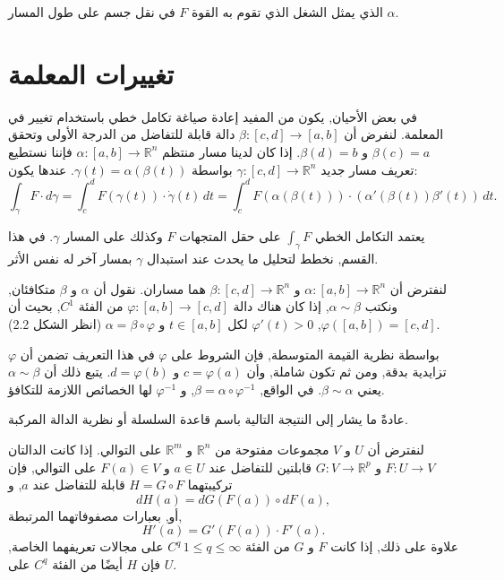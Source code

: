 الذي يمثل الشغل الذي تقوم به القوة \(F\) في نقل جسم على طول المسار \(\alpha\).


\section{ تغييرات المعلمة}

في بعض الأحيان, يكون من المفيد إعادة صياغة تكامل خطي باستخدام تغيير في المعلمة. لنفرض أن \(\beta : [c, d] \to [a, b]\) دالة قابلة للتفاضل من الدرجة الأولى وتحقق \(\beta(c) = a\) و \(\beta(d) = b\). إذا كان لدينا مسار منتظم \(\alpha : [a, b] \to \mathbb{R}^n\) فإننا نستطيع تعريف مسار جديد \(\gamma : [c, d] \to \mathbb{R}^n\) بواسطة \(\gamma(t) = \alpha(\beta(t))\). عندها يكون:
\[ \int_\gamma F \cdot d\gamma = \int_c^d F(\gamma(t)) \cdot \dot{\gamma}(t) \, dt = \int_c^d F(\alpha(\beta(t))) \cdot (\alpha'(\beta(t)) \beta'(t)) \, dt. \]

يعتمد التكامل الخطي \( \int_\gamma F \) على حقل المتجهات \( F \) وكذلك على المسار \( \gamma \). في هذا القسم, نخطط لتحليل ما يحدث عند استبدال \( \gamma \) بمسار آخر له نفس الأثر.

\begin{definition}
    
لنفترض أن \( \alpha : [a, b] \to \mathbb{R}^n \) و \( \beta : [c, d] \to \mathbb{R}^n \) هما مساران. نقول أن \( \alpha \) و \( \beta \) متكافئان, ونكتب \( \alpha \sim \beta \), إذا كان هناك دالة \( \varphi : [a, b] \to [c, d] \) من الفئة \( C^1 \), بحيث أن \( \varphi([a, b]) = [c, d] \), \( \varphi'(t) > 0 \) لكل \( t \in [a, b] \) و \( \alpha = \beta \circ \varphi \) (انظر الشكل 2.2).
\end{definition}

بواسطة نظرية القيمة المتوسطة, فإن الشروط على \( \varphi \) في هذا التعريف تضمن أن \( \varphi \) تزايدية بدقة, ومن ثم تكون شاملة, وأن \( c = \varphi(a) \) و \( d = \varphi(b) \). يتبع ذلك أن \( \alpha \sim \beta \) يعني \( \beta \sim \alpha \). في الواقع, \( \beta = \alpha \circ \varphi^{-1} \), و \( \varphi^{-1} \) لها الخصائص اللازمة للتكافؤ.

عادةً ما يشار إلى النتيجة التالية باسم قاعدة السلسلة أو نظرية الدالة المركبة. 

\begin{theoreme}
لنفترض أن \( U \) و \( V \) مجموعات مفتوحة من \( \mathbb{R}^n \) و \( \mathbb{R}^m \) على التوالي. إذا كانت الدالتان \( F : U \to V \) و \( G : V \to \mathbb{R}^p \) قابلتين للتفاضل عند \( a \in U \) و \( F(a) \in V \) على التوالي, فإن تركيبتهما \( H = G \circ F \) قابلة للتفاضل عند \( a \), و
\[ dH(a) = dG(F(a)) \circ dF(a), \]
أو, بعبارات مصفوفاتهما المرتبطة,
\[ H'(a) = G'(F(a)) \cdot F'(a). \]
علاوة على ذلك, إذا كانت \( F \) و \( G \) من الفئة \( C^q \, 1 \leq q \leq \infty\) على مجالات تعريفهما الخاصة, فإن \( H \) أيضًا من الفئة \( C^q \) على \( U \).
\end{theoreme}

